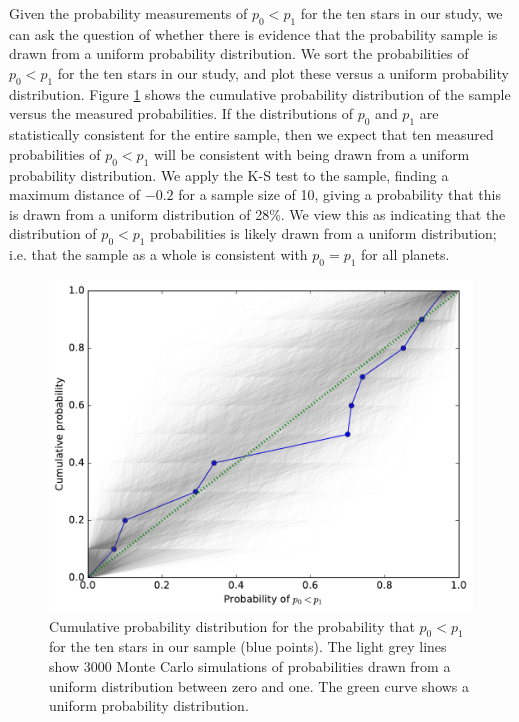 Given the probability measurements of $p_0 < p_1$ for the ten stars in our study, we can ask the question of
whether there is evidence that the probability sample is drawn from a uniform probability distribution.  
We sort the probabilities of $p_0 < p_1$ for the ten stars in our study, and plot these versus a uniform
probability distribution.  Figure \ref{fig:ks_sample} shows the cumulative probability distribution 
of the sample versus the measured probabilities.  If the distributions of $p_0$ and $p_1$ are
statistically consistent for the entire sample, then we expect that ten measured probabilities
of $p_0 < p_1$ will be consistent with being drawn from a uniform probability distribution.  
We apply the
K-S test to the sample, finding a maximum distance of $-0.2$ for a sample size of 10,
giving a probability that this is drawn from a uniform distribution of 28\%.  We view this
as indicating that the distribution of $p_0<p_1$ probabilities is likely drawn from a uniform 
distribution;  i.e. that the sample as a whole is consistent with $p_0 = p_1$ for all planets.

\begin{figure}
    \centering
    \includegraphics[scale=0.45]{robin/KS_p0_p1.pdf}
    \caption{Cumulative probability distribution for the probability that
    $p_0 < p_1$ for the ten stars in our sample (blue points).  The light grey lines show $3000$ Monte
    Carlo simulations of probabilities drawn from a uniform distribution between zero
    and one.  The green curve shows a uniform probability distribution.}
    \label{fig:ks_sample}
\end{figure}

